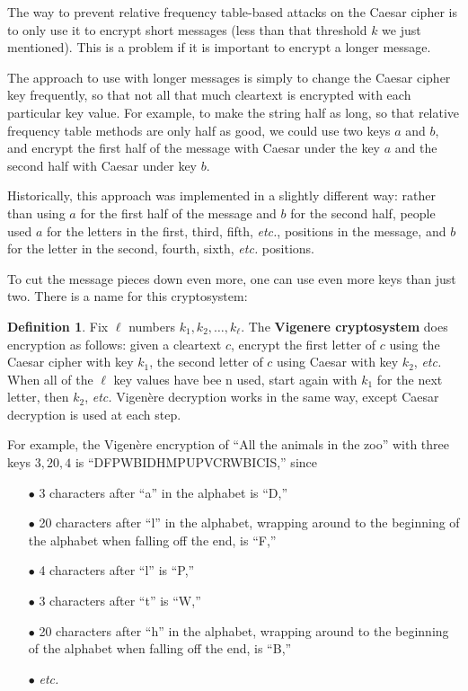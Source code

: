 \documentclass[12pt,letterpaper]{amsbook}
\theoremstyle{definition}
\newtheorem{definition}[theorem]{Definition}
\theoremstyle{remark}
\numberwithin{figure}{section}
\numberwithin{exercise}{chapter}
\numberwithin{section}{chapter}
\numberwithin{equation}{section}
\numberwithin{table}{subsection}
\begin{document}
The way to prevent relative frequency table-based attacks on the Caesar cipher
is to only use it to encrypt short messages (less than that threshold $k$ we
just mentioned).  This is a problem if it is important to encrypt a longer
message.

The approach to use with longer messages is simply to change the Caesar cipher
key frequently, so that not all that much cleartext is encrypted with each
particular key value.  For example, to make the string half as long, so that
relative frequency table methods are only half as good, we could use two keys
$a$ and $b$, and encrypt the first half of the message with Caesar under the
key $a$ and the second half with Caesar under key $b$.

Historically, this approach was implemented in a slightly different way: rather
than using $a$ for the first half of the message and $b$ for the second half,
people used $a$ for the letters in the first, third, fifth, \textit{etc.},
positions in the message, and $b$ for the letter in the second, fourth, sixth,
\textit{etc.} positions.

To cut the message pieces down even more, one can use even more keys than just
two.  There is a name for this cryptosystem:
\begin{definition}\label{def:vigenere}
Fix $\ell$ numbers $k_1,k_2,\dots,k_\ell$.  The \textbf{Vigenere cryptosystem}
does encryption as follows: given a cleartext $c$, encrypt the first letter
of $c$ using the Caesar cipher with key $k_1$, the second letter of $c$ using
Caesar with key $k_2$, \textit{etc.}  When all of the $\ell$ key values have
bee n used, start again with $k_1$ for the next letter, then
$k_2$, \textit{etc.}  Vigen\`ere decryption works in the same way, except
Caesar decryption is used at each step.
\end{definition}

For example, the Vigen\`ere encryption of ``All the animals in the zoo'' with
three keys $3, 20, 4$ is ``DFPWBIDHMPUPVCRWBICIS,'' since
\begin{itemize}
\item[$\bullet$] 3 characters after ``a'' in the alphabet is ``D,''
\item[$\bullet$] 20 characters after ``l'' in the alphabet, wrapping around to
the beginning of the alphabet when falling off the end, is ``F,''
\item[$\bullet$] 4 characters after ``l'' is ``P,''
\item[$\bullet$] 3 characters after ``t'' is ``W,''
\item[$\bullet$] 20 characters after ``h'' in the alphabet, wrapping around to
the beginning of the alphabet when falling off the end, is ``B,''
\item[$\bullet$]  \textit{etc.}
\end{itemize}
\end{document}
